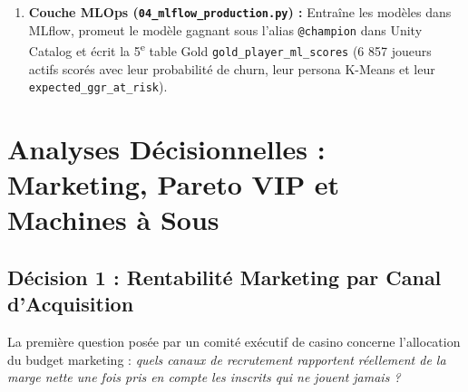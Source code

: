 \documentclass[11pt,a4paper]{article}
\begin{document}
\begin{enumerate}
\begin{itemize}
        \item \texttt{gold\_session\_risk} (46 690 lignes) : audit de chaque session combinant 6 signaux de risque (cadence extrême, durée prolongée, mise maximale, incohérence pays, partage d'IP, partage d'appareil) en un \texttt{risk\_score} et un \texttt{risk\_level} (\texttt{High}, \texttt{Medium}, \texttt{Low}, \texttt{Normal}).
    \end{itemize}
    \item \textbf{Couche MLOps (\texttt{04\_mlflow\_production.py}) :} Entraîne les modèles dans MLflow, promeut le modèle gagnant sous l'alias \texttt{@champion} dans Unity Catalog et écrit la 5\textsuperscript{e} table Gold \texttt{gold\_player\_ml\_scores} (6 857 joueurs actifs scorés avec leur probabilité de churn, leur persona K-Means et leur \texttt{expected\_ggr\_at\_risk}).
\end{enumerate}

\newpage
\section{Analyses Décisionnelles : Marketing, Pareto VIP et Machines à Sous}

\subsection{Décision 1 : Rentabilité Marketing par Canal d'Acquisition}
La première question posée par un comité exécutif de casino concerne l'allocation du budget marketing : \textit{quels canaux de recrutement rapportent réellement de la marge nette une fois pris en compte les inscrits qui ne jouent jamais ?}
\end{document}
